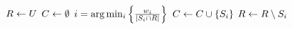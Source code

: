 
$R\leftarrow U$\;
$C\leftarrow\emptyset$\;
 {
	$i=\arg\min_i \left\{ \frac{w_i}{| S_i \cap R |} \right\}$\;
	$C\leftarrow C\cup\left\{ S_i \right\}$\;
	$R\leftarrow R\setminus S_i$\;
}
\;
